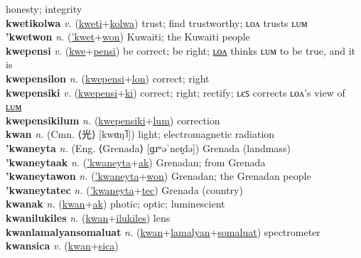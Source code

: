 honesty; integrity \label{kwetilyan} \\
\textbf{kwetikolwa} \textit{v.} (\hyperref[kweti]{kweti}+\hyperref[kolwa]{kolwa})
trust; find trustworthy; ʟᴏᴧ trusts ʟᴜᴍ \label{kwetikolwa} \\
\textbf{'kwetwon} \textit{n.} (\hyperref['kwet]{'kwet}+\hyperref[won]{won})
Kuwaiti; the Kuwaiti people \label{'kwetwon} \\
\textbf{kwepensi} \textit{v.} (\hyperref[kwe]{kwe}+\hyperref[pensi]{pensi})
be correct; be right; \hyperref[kwepensilon]{ʟᴏᴧ} thinks ʟᴜᴍ to be true, and it is \label{kwepensi} \\
\textbf{kwepensilon} \textit{n.} (\hyperref[kwepensi]{kwepensi}+\hyperref[lon]{lon})
correct; right \label{kwepensilon} \\
\textbf{kwepensiki} \textit{v.} (\hyperref[kwepensi]{kwepensi}+\hyperref[ki]{ki})
correct; right; rectify; ʟєꜱ corrects ʟᴏᴧ’s view of \hyperref[kwepensikilum]{ʟᴜᴍ} \label{kwepensiki} \\
\textbf{kwepensikilum} \textit{n.} (\hyperref[kwepensiki]{kwepensiki}+\hyperref[lum]{lum})
correction \label{kwepensikilum} \\
\textbf{kwan} \textit{n.} (Cmn. ⟨光⟩ [kwɑŋ˥])
light; electromagnetic radiation \label{kwan} \\
\textbf{'kwaneyta} \textit{n.} (Eng. ⟨Grenada⟩ [ɡɹʷəˈneɪ̯də])
Grenada (landmass) \label{'kwaneyta} \\
\textbf{'kwaneytaak} \textit{n.} (\hyperref['kwaneyta]{'kwaneyta}+\hyperref[ak]{ak})
Grenadan; from Grenada \label{'kwaneytaak} \\
\textbf{'kwaneytawon} \textit{n.} (\hyperref['kwaneyta]{'kwaneyta}+\hyperref[won]{won})
Grenadan; the Grenadan people \label{'kwaneytawon} \\
\textbf{'kwaneytatec} \textit{n.} (\hyperref['kwaneyta]{'kwaneyta}+\hyperref[tec]{tec})
Grenada (country) \label{'kwaneytatec} \\
\textbf{kwanak} \textit{n.} (\hyperref[kwan]{kwan}+\hyperref[ak]{ak})
photic; optic; luminescient \label{kwanak} \\
\textbf{kwanilukiles} \textit{n.} (\hyperref[kwan]{kwan}+\hyperref[ilukiles]{ilukiles})
lens \label{kwanilukiles} \\
\textbf{kwanlamalyansomaluat} \textit{n.} (\hyperref[kwan]{kwan}+\hyperref[lamalyan]{lamalyan}+\hyperref[somaluat]{somaluat})
spectrometer \label{kwanlamalyansomaluat} \\
\textbf{kwansica} \textit{v.} (\hyperref[kwan]{kwan}+\hyperref[sica]{sica})
